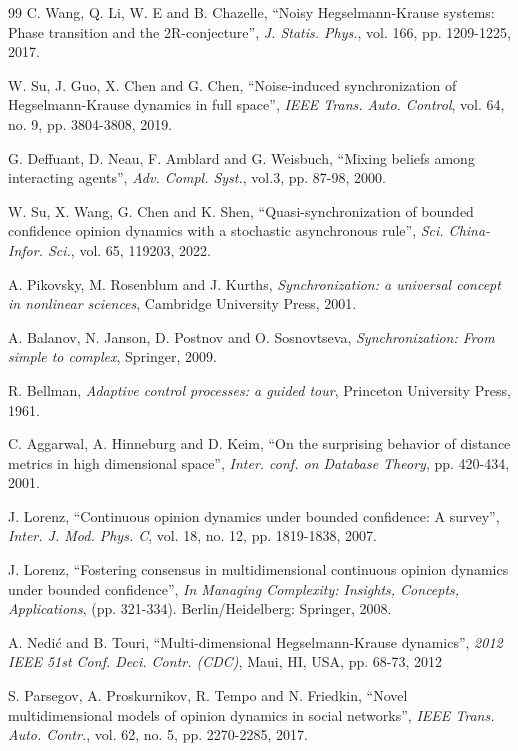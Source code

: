 \documentclass[11pt]{article}
\theoremstyle{definition}
\theoremstyle{remark}
\numberwithin{equation}{section}
\begin{document}
\begin{thebibliography}{99}
C. Wang, Q. Li, W. E and B. Chazelle, ``Noisy Hegselmann-Krause systems: Phase transition and the 2R-conjecture'', \emph{J. Statis. Phys.}, vol. 166, pp. 1209-1225, 2017.

W. Su, J. Guo, X. Chen and G. Chen, ``Noise-induced synchronization of Hegselmann-Krause dynamics in full space'', \emph{IEEE Trans. Auto. Control}, vol. 64, no. 9, pp. 3804-3808, 2019.

G. Deffuant, D. Neau, F. Amblard and G. Weisbuch, ``Mixing beliefs among interacting agents'', \emph{Adv. Compl. Syst.}, vol.3,  pp. 87-98, 2000.

W. Su, X. Wang, G. Chen and K. Shen, ``Quasi-synchronization of bounded confidence opinion dynamics with a stochastic asynchronous rule'', \emph{Sci. China-Infor. Sci.}, vol. 65, 119203, 2022.

A. Pikovsky, M. Rosenblum and J. Kurths, \emph{Synchronization: a universal concept in nonlinear sciences}, Cambridge University Press, 2001.

A. Balanov, N. Janson, D. Postnov and O. Sosnovtseva, \emph{Synchronization: From simple to complex}, Springer, 2009.

R. Bellman, \emph{Adaptive control processes: a guided tour}, Princeton University Press, 1961.

C. Aggarwal, A. Hinneburg and D. Keim, ``On the surprising behavior of distance metrics in high dimensional space'', \emph{Inter. conf. on Database Theory}, pp. 420-434, 2001.

J. Lorenz, ``Continuous opinion dynamics under bounded confidence: A survey'', \emph{Inter. J. Mod. Phys. C}, vol. 18, no. 12, pp. 1819-1838, 2007.

J. Lorenz, ``Fostering consensus in multidimensional continuous opinion dynamics under bounded confidence'', \emph{In Managing Complexity: Insights, Concepts, Applications}, (pp. 321-334). Berlin/Heidelberg: Springer, 2008.

A. Nedi\'{c} and B. Touri, ``Multi-dimensional Hegselmann-Krause dynamics'', \emph{2012 IEEE 51st Conf. Deci. Contr. (CDC)}, Maui, HI, USA, pp. 68-73, 2012

S. Parsegov, A. Proskurnikov, R. Tempo and N. Friedkin, ``Novel multidimensional models of opinion dynamics in social networks'', \emph{IEEE Trans. Auto. Contr.}, vol. 62, no. 5, pp. 2270-2285, 2017.


\end{thebibliography}
\end{document}

